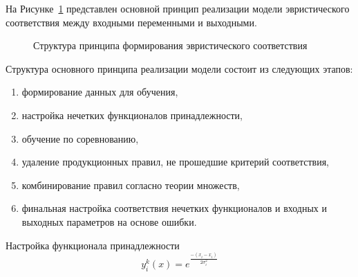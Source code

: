 На Рисунке~\cref{fig:FLbase} представлен основной принцип реализации модели эвристического соответствия между входными переменными и выходными.
\begin{figure}[ht]
    \caption{Структура принципа формирования эвристического соответствия}\label{fig:FLbase}
\end{figure}

Структура основного принципа реализации модели состоит из следующих этапов:
\begin{enumerate}
	\item формирование данных для обучения,
	\item настройка нечетких функционалов принадлежности,
	\item обучение по соревнованию,
	\item удаление продукционных правил, не прошедшие критерий соответствия,
	\item комбинирование правил согласно теории множеств,
	\item финальная настройка соответствия нечетких функционалов и входных и выходных параметров на основе ошибки. 
\end{enumerate}

Настройка функционала принадлежности
\begin{equation}
    \label{eq:equation59}
     y_i^{k}(x) = e^{\frac{-(x_i-x_i)}{2\sigma_i^2}}
\end{equation}

